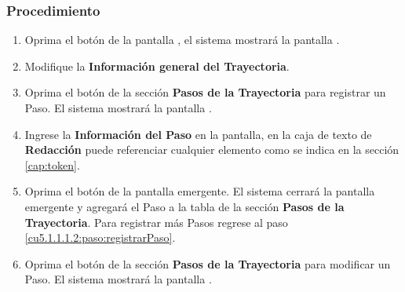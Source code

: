 \subsubsection{Procedimiento}
\begin{enumerate}
	\item Oprima el botón  de la pantalla , el sistema mostrará la pantalla . 

	
	\item Modifique la \textbf{Información general del Trayectoria}.
	
	\item Oprima el botón  de la sección \textbf{Pasos de la Trayectoria} para registrar un Paso. El sistema mostrará la pantalla . \label{cu5.1.1.1.2:paso:registrarPaso}

	
	\item Ingrese la \textbf{Información del Paso} en la pantalla, en la caja de texto de \textbf{Redacción} puede referenciar cualquier elemento como se indica en la sección \ref{cap:token}.
	
	\item Oprima el botón  de la pantalla emergente. El sistema cerrará la pantalla emergente y agregará el Paso a la tabla de la sección \textbf{Pasos de la Trayectoria}. Para registrar más Pasos regrese al paso \ref{cu5.1.1.1.2:paso:registrarPaso}.
	
	\item Oprima el botón \btnEditar de la sección \textbf{Pasos de la Trayectoria} para modificar un Paso. El sistema mostrará la pantalla . \label{cu5.1.1.1.2:paso:modificarPaso}


\end{enumerate}
